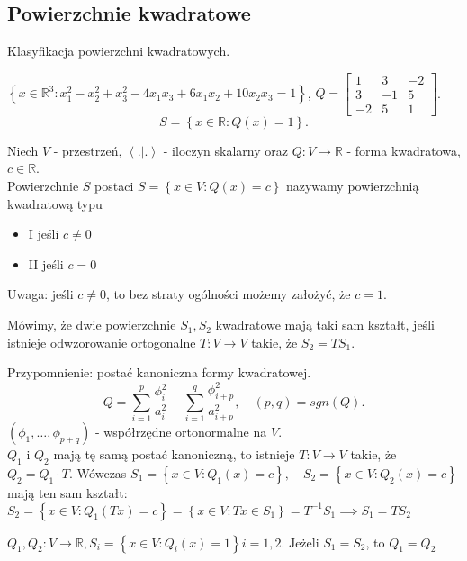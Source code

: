 \documentclass[../main.tex]{subfiles}
\begin{document}
\subsection{Powierzchnie kwadratowe}
Klasyfikacja powierzchni kwadratowych.
\begin{przyklad}
    $\left\{ x\in \mathbb{R}^3: x_1^2 - x_2^2 + x_3^2 - 4x_1x_3 + 6x_1x_2 + 10x_2x_3 = 1 \right\} $, $Q = \begin{bmatrix} 1&3&-2\\3&-1&5\\-2&5&1 \end{bmatrix} $.\\
    \[
        S = \left\{ x\in \mathbb{R}: Q(x) = 1 \right\}
    .\]
\end{przyklad}
\begin{definicja}
    Niech $V$ - przestrzeń, $\left<.|. \right>$ - iloczyn skalarny oraz $Q: V\to \mathbb{R}$ - forma kwadratowa, $c\in \mathbb{R}$.\\
    Powierzchnie $S$ postaci $S = \left\{ x\in V: Q(x) = c \right\} $ nazywamy powierzchnią kwadratową typu
    \begin{itemize}
        \item I jeśli $c\neq 0$
        \item II jeśli $c = 0$
    \end{itemize}
\end{definicja}
Uwaga: jeśli $c\neq 0$, to bez straty ogólności możemy założyć, że $c = 1$.
\begin{definicja}
    Mówimy, że dwie powierzchnie $S_1,S_2$ kwadratowe mają taki sam kształt, jeśli istnieje odwzorowanie ortogonalne $T: V\to V$ takie, że $S_2 = T S_1$.
\end{definicja}
Przypomnienie: postać kanoniczna formy kwadratowej.\\
\[
    Q = \sum_{i=1}^p \frac{\phi_i^2}{a_i^2} - \sum_{i=1}^q \frac{\phi_{i+p}^2}{a_{i+p}^2},\quad (p,q) = sgn(Q)
.\]
$\left( \phi_1,\ldots,\phi_{p+q} \right) $ - współrzędne ortonormalne na $V$.\\
$Q_1$ i $Q_2$ mają tę samą postać kanoniczną, to istnieje $T: V\to V$ takie, że $Q_2 = Q_1 \cdot T$. Wówczas $S_1 = \left\{ x\in V: Q_1(x) = c \right\} ,\quad S_2 = \left\{ x\in V: Q_2(x) = c \right\} $ mają ten sam kształt: $S_2 = \left\{ x\in V: Q_1(T x) = c \right\} = \left\{ x\in V: T x\in S_1 \right\} = T^{-1}S_1 \implies S_1 = TS_2$
\begin{tw}
    $Q_1,Q_2: V\to \mathbb{R}, S_i = \left\{ x\in V: Q_i(x) = 1 \right\} i = 1,2$. Jeżeli $S_1 = S_2$, to $Q_1 = Q_2$
\end{tw}
\end{document}
